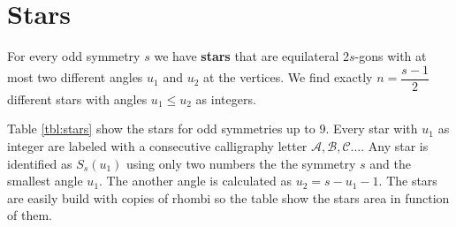 \documentclass[11pt]{article}
\begin{document}
\section{Stars}

For every odd symmetry $s$ we have \textbf{stars} that are equilateral 2$s$-gons with at most two different angles $u_1$ and $u_2$ at the vertices. We find exactly $n = \dfrac{s-1}2$ different stars with angles $u_1 \leq u_2$ as integers.

Table \ref{tbl:stars} show the stars for odd symmetries up to $9$. Every star with $u_1$ as integer are labeled with a consecutive calligraphy letter $\mathcal{A}, \mathcal{B}, \mathcal{C}...$.
Any star is identified as $S_s(u_1)$ using only two numbers the the symmetry $s$ and the smallest angle $u_1$. The another angle is calculated as $u_2 = s - u_1 - 1$. The stars are easily build with copies of rhombi so the table show the stars area in function of them.
\end{document}
